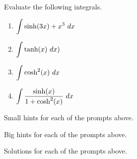 \begin{activity} \label{A:6.8.3} Evaluate the following integrals.
\bmtwo
\begin{enumerate}[1)]
\item $\ds \int \sinh(3x)+x^3 \ dx  $
\item $\displaystyle \int \tanh(x) \ dx ) $
\item $\ds \int \cosh^2(x) \ dx  $
\item $\displaystyle \int \frac{\sinh(x)}{1 +  \cosh^2(x)} \ dx $
\end{enumerate}
\emtwo
\end{activity}
\begin{smallhint}
\ba
	\item Small hints for each of the prompts above.
\ea
\end{smallhint}
\begin{bighint}
\ba
	\item Big hints for each of the prompts above.
\ea
\end{bighint}
\begin{activitySolution}
\ba
	\item Solutions for each of the prompts above.
\ea
\end{activitySolution}
\aftera